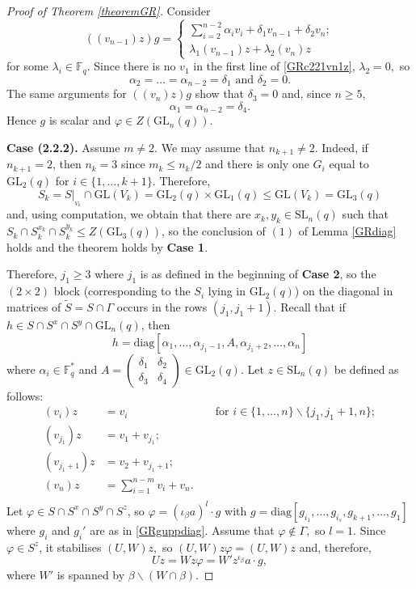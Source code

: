 \documentclass[a4paper,reqno,11pt]{amsart}
\theoremstyle{definition}
\theoremstyle{remark}
\numberwithin{equation}{section}
\newcommand{\diag}{\mathrm{diag}}
\newcommand{\SL}{{\mathrm{SL}}}
\newcommand{\GL}{{\mathrm{GL}}}
\begin{document}
\begin{proof}[Proof of Theorem {\rm \ref{theoremGR}}]
 Consider 
\begin{equation}
\label{GRc221vn1z}
 ((v_{n-1})z)g =
 \begin{cases}
 \sum_{i=2}^{n-2} \alpha_i v_i + \delta_1 v_{n-1} + \delta_2 v_n;\\
 \lambda_1 (v_{n-1})z + \lambda_2 (v_{n})z
 \end{cases}
 \end{equation}
 for some $\lambda_{i} \in \mathbb{F}_q.$ Since there is no $v_1$ in the first line of \eqref{GRc221vn1z}, $\lambda_2=0,$ so
 $$\alpha_2 = \ldots = \alpha_{n-2}=\delta_1 \text{ and } \delta_2=0.$$
 The same arguments for $((v_{n})z)g$ show that $\delta_3=0$ and, since $n \ge 5$,
 $$\alpha_1=\alpha_{n-2}=\delta_4.$$
 Hence $g$ is scalar and $\varphi \in Z(\GL_n(q)).$
 
 \medskip
 
 {\bf Case (2.2.2).} Assume $m\ne 2.$  
  We may assume that $n_{k+1}\ne 2$. Indeed, if $n_{k+1}=2$, then  $n_{k}=3$ since $m_k\le n_k/2$ and there is only one $G_i$ equal to $\GL_2(q)$ for $i \in \{1, \ldots, k+1\}.$ Therefore, $$S_k=S|_{_{V_k}}\cap \GL(V_k)=\GL_2(q) \times \GL_1(q) \le \GL(V_k)=\GL_3(q)$$ and, using computation, we obtain that  there are $x_k, y_k \in \SL_n(q)$ such that $S_k \cap S_k^{x_k} \cap S_k^{y_k} \le Z(\GL_3(q))$, so the conclusion of  $(1)$ of Lemma \ref{GRdiag} holds and the theorem  holds by {\bf Case  1}. 
  
  Therefore, $j_1\ge 3$ where $j_1$ is as defined in the beginning of {\bf Case  2}, so the $(2 \times 2)$ block (corresponding to the $S_i$ lying in $\GL_2(q)$) on the diagonal in matrices of $\tilde{S}=S \cap \Gamma$ occurs in the rows $(j_1, j_1+1)$. Recall that if $h \in  S \cap S^x \cap S^y \cap  \GL_n(q)$, then $$h= \diag[\alpha_1, \ldots, \alpha_{j_1-1},A, \alpha_{j_1+2}, \ldots, \alpha_n]$$ where $\alpha_i \in \mathbb{F}_q^*$ and $A= \left( \begin{smallmatrix} \delta_1 & \delta_2 \\ \delta_3 & \delta_4  \end{smallmatrix} \right) \in \GL_2(q).$ Let $z \in \SL_n(q)$ be defined as follows:
\begin{equation}
\label{GRzdefcase222}
\begin{aligned}
(v_i)z & =  v_i &&\text{ for } i \in \{1, \ldots, n\} \backslash \{j_1, j_1+1, n\}; \\
(v_{j_1})z & =  v_1 + v_{j_1};\\
(v_{j_1+1})z & =  v_2 + v_{j_1+1};\\
(v_{n})z & =   \sum_{i=1}^{n-m} v_i   + v_{n}.\\
\end{aligned} 
\end{equation}
Let $\varphi \in S \cap S^x \cap S^y \cap S^z$, so $\varphi= (\iota_{\beta}a)^l \cdot g$ with $g=\diag[g_{i_1},\ldots, g_{i_s}, g_{k+1}, \ldots, g_1]$ where $g_i$ and $g_i'$ are as in \eqref{GRguppdiag}.  
 Assume that $\varphi \notin \Gamma,$ so $l=1.$ Since $\varphi \in S^z$, it stabilises $(U,W)z,$ so $(U,W)z \varphi =(U,W)z$ and, therefore, 
$$Uz=Wz \varphi = W'z^{\iota_{\beta}}a \cdot g,$$
where $W'$ is spanned by $\beta \backslash (W \cap \beta).$  


\end{proof}
\end{document}
